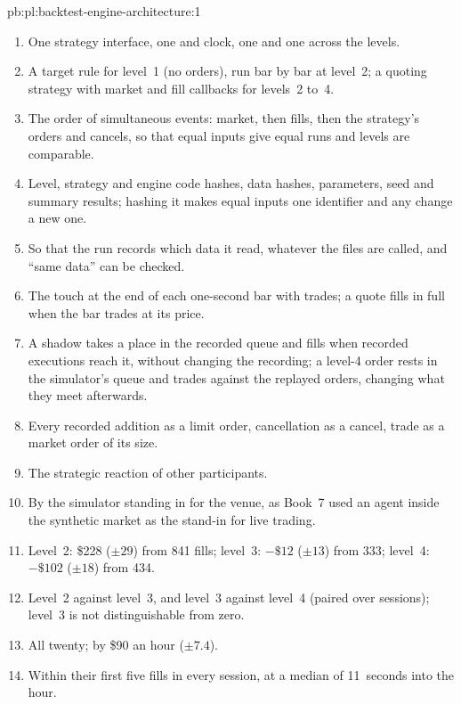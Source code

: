 \begin{solution}{pb:pl:backtest-engine-architecture:1}
\begin{enumerate}
\item One strategy interface, one  and clock, one  and one  across the levels.
\item A target rule for level~1 (no orders), run bar by bar at level~2; a quoting strategy with market and fill callbacks for levels~2
to~4.
\item The order of simultaneous events: market, then fills, then the strategy's orders and cancels, so that equal inputs give equal runs and
levels are comparable.
\item Level, strategy and engine code hashes, data hashes, parameters, seed and summary results; hashing it makes equal inputs one
identifier and any change a new one.
\item So that the run records which data it read, whatever the files are called, and ``same data'' can be checked.
\item The touch at the end of each one-second bar with trades; a quote fills in full when the bar trades at its price.
\item A shadow takes a place in the recorded queue and fills when recorded executions reach it, without changing the recording; a level-4
order rests in the simulator's queue and trades against the replayed orders, changing what they meet afterwards.
\item Every recorded addition as a limit order, cancellation as a cancel, trade as a market order of its size.
\item The strategic reaction of other participants.
\item By the simulator standing in for the venue, as Book~7 used an agent inside the synthetic market as the stand-in for live trading.
\item Level~2: \$228 ($\pm 29$) from 841 fills; level~3: $-\$12$ ($\pm 13$) from 333; level~4: $-\$102$ ($\pm 18$) from 434.
\item Level~2 against level~3, and level~3 against level~4 (paired over sessions); level~3 is not distinguishable from zero.
\item All twenty; by \$90 an hour ($\pm 7.4$).
\item Within their first five fills in every session, at a median of 11~seconds into the hour.

\end{enumerate}
\end{solution}
